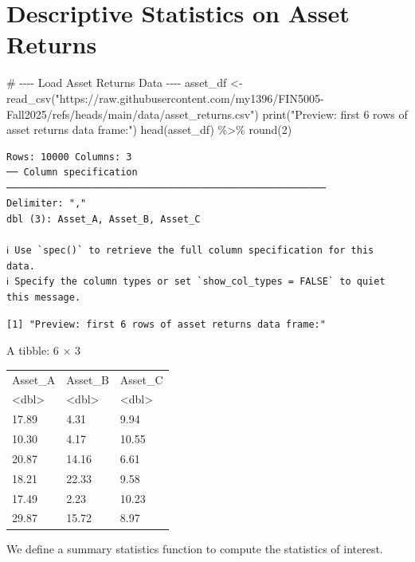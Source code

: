 \documentclass[
  12pt,
  a4paper,
]{scrbook}
\newenvironment{Shaded}{\begin{snugshade}}{\end{snugshade}}
\newcommand{\CommentTok}[1]{\textcolor[rgb]{0.37,0.37,0.37}{#1}}
\newcommand{\DecValTok}[1]{\textcolor[rgb]{0.68,0.00,0.00}{#1}}
\newcommand{\FunctionTok}[1]{\textcolor[rgb]{0.28,0.35,0.67}{#1}}
\newcommand{\NormalTok}[1]{\textcolor[rgb]{0.00,0.23,0.31}{#1}}
\newcommand{\OtherTok}[1]{\textcolor[rgb]{0.00,0.23,0.31}{#1}}
\newcommand{\SpecialCharTok}[1]{\textcolor[rgb]{0.37,0.37,0.37}{#1}}
\newcommand{\StringTok}[1]{\textcolor[rgb]{0.13,0.47,0.30}{#1}}
\theoremstyle{plain}
\theoremstyle{definition}
\theoremstyle{remark}
\begin{document}
\section{Descriptive Statistics on Asset
Returns}\label{descriptive-statistics-on-asset-returns}

\begin{Shaded}
\begin{Highlighting}[]
\CommentTok{\# {-}{-}{-}{-} Load Asset Returns Data {-}{-}{-}{-}}
\NormalTok{asset\_df }\OtherTok{\textless{}{-}} \FunctionTok{read\_csv}\NormalTok{(}\StringTok{"https://raw.githubusercontent.com/my1396/FIN5005{-}Fall2025/refs/heads/main/data/asset\_returns.csv"}\NormalTok{)}
\FunctionTok{print}\NormalTok{(}\StringTok{"Preview: first 6 rows of asset returns data frame:"}\NormalTok{)}
\FunctionTok{head}\NormalTok{(asset\_df) }\SpecialCharTok{\%\textgreater{}\%} \FunctionTok{round}\NormalTok{(}\DecValTok{2}\NormalTok{)}
\end{Highlighting}
\end{Shaded}

\begin{verbatim}
Rows: 10000 Columns: 3
── Column specification ────────────────────────────────────────────────────────
Delimiter: ","
dbl (3): Asset_A, Asset_B, Asset_C

ℹ Use `spec()` to retrieve the full column specification for this data.
ℹ Specify the column types or set `show_col_types = FALSE` to quiet this message.
\end{verbatim}

\begin{verbatim}
[1] "Preview: first 6 rows of asset returns data frame:"
\end{verbatim}

A tibble: 6 × 3
\begin{tabular}{lll}
 Asset\_A & Asset\_B & Asset\_C\\
 <dbl> & <dbl> & <dbl>\\
\hline
     17.89 &  4.31 &  9.94\\
     10.30 &  4.17 & 10.55\\
     20.87 & 14.16 &  6.61\\
     18.21 & 22.33 &  9.58\\
     17.49 &  2.23 & 10.23\\
     29.87 & 15.72 &  8.97\\
\end{tabular}

We define a summary statistics function to compute the statistics of
interest.
\end{document}

